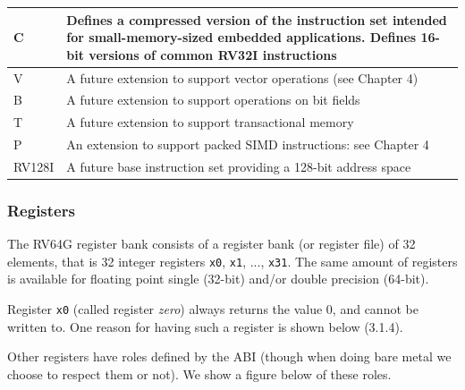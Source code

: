 \documentclass[a4paper,11pt]{article}
\begin{document}
\begin{table}[H]
\begin{tabular}{ p{4cm} p{10cm}}
		\hline
		C                                  & Defines a compressed version of the instruction set intended for small-memory-sized embedded applications. Defines 16-bit versions of common RV32I instructions     \\
		\hline
		V                                  & A future extension to support vector operations (see Chapter 4)                                                                                                     \\
		\hline
		B                                  & A future extension to support operations on bit fields                                                                                                              \\
		\hline
		T                                  & A future extension to support transactional memory                                                                                                                  \\
		\hline
		P                                  & An extension to support packed SIMD instructions: see Chapter 4                                                                                                     \\
		\hline
		RV128I                             & A future base instruction set providing a 128-bit address space                                                                                                     \\
		\hline
	\end{tabular}
\end{table}

\subsubsection{Registers}

The RV64G register bank consists of a register bank (or register file) of
32 elements, that is 32 integer registers \texttt{x0}, \texttt{x1}, ..., \texttt{x31}.
The same amount of registers is available for floating point single (32-bit) and/or double precision (64-bit).

Register \texttt{x0} (called register \textit{zero}) always returns the value 0, and cannot be written to. One reason for having such a register is shown below (3.1.4).

Other registers have roles defined by the ABI (though when doing bare metal we choose to respect them or not).
We show a figure below of these roles.
\end{document}
